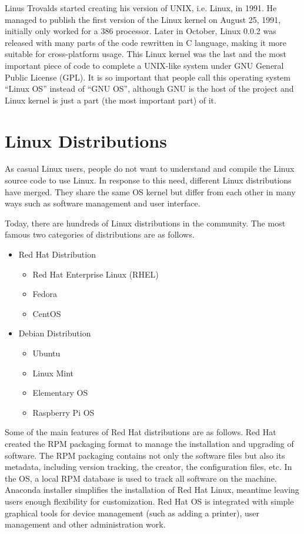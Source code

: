 Linus Trovalds started creating his version of UNIX, i.e. Linux, in 1991. He managed to publish the first version of the Linux kernel on August 25, 1991, initially only worked for a 386 processor. Later in October, Linux 0.0.2 was released with many parts of the code rewritten in C language, making it more suitable for cross-platform usage. This Linux kernel was the last and the most important piece of code to complete a UNIX-like system under GNU General Public License (GPL). It is so important that people call this operating system ``Linux OS'' instead of ``GNU OS'', although GNU is the host of the project and Linux kernel is just a part (the most important part) of it.

\section{Linux Distributions}

As casual Linux users, people do not want to understand and compile the Linux source code to use Linux. In response to this need, different Linux distributions have merged. They share the same OS kernel but differ from each other in many ways such as software management and user interface.

Today, there are hundreds of Linux distributions in the community. The most famous two categories of distributions are as follows.
\begin{itemize}
  \item Red Hat Distribution
  \begin{itemize}
    \item Red Hat Enterprise Linux (RHEL)
    \item Fedora
    \item CentOS
  \end{itemize}
  \item Debian Distribution
  \begin{itemize}
    \item Ubuntu
    \item Linux Mint
    \item Elementary OS
    \item Raspberry Pi OS
  \end{itemize}
\end{itemize}

Some of the main features of Red Hat distributions are as follows. Red Hat created the RPM packaging format to manage the installation and upgrading of software. The RPM packaging contains not only the software files but also its metadata, including version tracking, the creator, the configuration files, etc. In the OS, a local RPM database is used to track all software on the machine. Anaconda installer simplifies the installation of Red Hat Linux, meantime leaving users enough flexibility for customization. Red Hat OS is integrated with simple graphical tools for device management (such as adding a printer), user management and other administration work.


